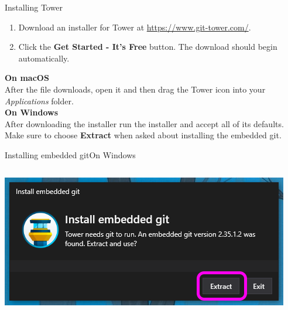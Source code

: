 \documentclass[aspectratio=169]{beamer}
\begin{document}
\begin{frame}[fragile]{Installing Tower}
    \begin{enumerate}[label={\arabic*.},itemsep=5pt]
        \item Download an installer for Tower at \href{https://www.git-tower.com/}{https://www.git-tower.com/}. \\
        \item Click the \textbf{Get Started - It's Free} button.
            The download should begin automatically.
    \end{enumerate}
    \vspace{10pt}
    \textbf{On macOS} \\
        After the file downloads, open it and then drag the Tower icon into your \textit{Applications} folder. \\
    \vspace{20pt}
    \textbf{On Windows} \\
        After downloading the installer run the installer and accept all of its defaults.
        Make sure to choose \textbf{Extract} when asked about installing the embedded git.
\end{frame}


\begin{frame}{Installing embedded git}{On Windows}
    \begin{columns}
        \begin{column}{0.5\textwidth}
            \centering
            \includegraphics[width=\linewidth]{extract_embedded_git.png}
        \end{column}
    \end{columns}
\end{frame}
\end{document}
